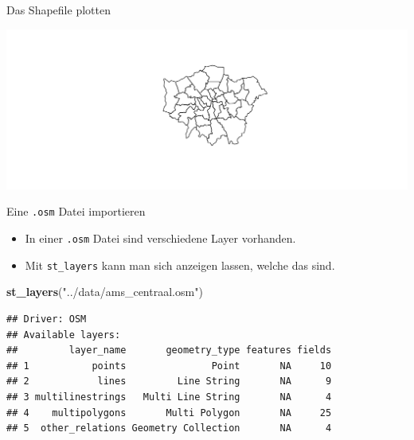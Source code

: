 \documentclass[ignorenonframetext,]{beamer}
\newenvironment{Shaded}{\begin{snugshade}}{\end{snugshade}}
\newcommand{\KeywordTok}[1]{\textcolor[rgb]{0.13,0.29,0.53}{\textbf{#1}}}
\newcommand{\NormalTok}[1]{#1}
\newcommand{\OperatorTok}[1]{\textcolor[rgb]{0.81,0.36,0.00}{\textbf{#1}}}
\newcommand{\StringTok}[1]{\textcolor[rgb]{0.31,0.60,0.02}{#1}}
\providecommand{\tightlist}{%
  \setlength{\itemsep}{0pt}\setlength{\parskip}{0pt}}
\begin{document}
\begin{frame}[fragile]{Das Shapefile plotten}
\protect\hypertarget{das-shapefile-plotten}{}

\begin{Shaded}
\end{Shaded}

\includegraphics{B7_simplefeatures_files/figure-beamer/unnamed-chunk-16-1.pdf}

\end{frame}

\begin{frame}[fragile]{Eine \texttt{.osm} Datei importieren}
\protect\hypertarget{eine-.osm-datei-importieren}{}

\begin{itemize}
\tightlist
\item
  In einer \texttt{.osm} Datei sind verschiedene Layer vorhanden.
\item
  Mit \texttt{st\_layers} kann man sich anzeigen lassen, welche das
  sind.
\end{itemize}

\begin{Shaded}
\begin{Highlighting}[]
\KeywordTok{st_layers}\NormalTok{(}\StringTok{"../data/ams_centraal.osm"}\NormalTok{)}
\end{Highlighting}
\end{Shaded}

\begin{verbatim}
## Driver: OSM 
## Available layers:
##         layer_name       geometry_type features fields
## 1           points               Point       NA     10
## 2            lines         Line String       NA      9
## 3 multilinestrings   Multi Line String       NA      4
## 4    multipolygons       Multi Polygon       NA     25
## 5  other_relations Geometry Collection       NA      4
\end{verbatim}

\end{frame}
\end{document}

